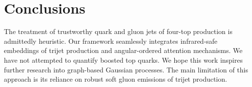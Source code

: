\section{Conclusions}\label{sec:conclusions}

The treatment of trustworthy quark and gluon jets of four-top production
is admittedly heuristic. Our framework seamlessly integrates
infrared-safe embeddings of trijet production and angular-ordered
attention mechanisms. We have not attempted to quantify boosted top
quarks. We hope this work inspires further research into graph-based
Gaussian processes. The main limitation of this approach is its reliance
on robust soft gluon emissions of trijet production.

